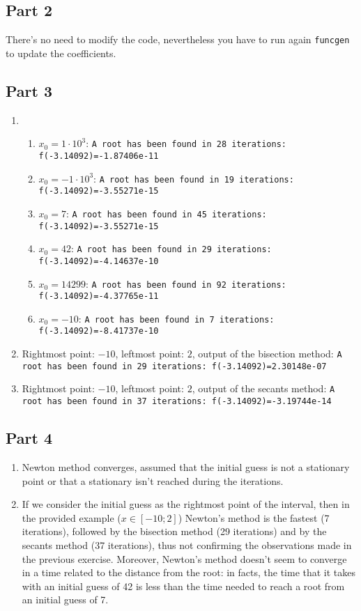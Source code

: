 \documentclass[a4paper,12pt]{article}
\begin{document}
     \subsection{Part 2}
          \par There's no need to modify the code, nevertheless you have to run again \verb|funcgen| to update the coefficients.
     \subsection{Part 3}
          \begin{enumerate}
               \item \begin{enumerate}
                    \item $x_0=1\cdot 10^3$: \verb|A root has been found in 28 iterations: f(-3.14092)=-1.87406e-11|
                    \item $x_0= - 1\cdot 10^3$: \verb|A root has been found in 19 iterations: f(-3.14092)=-3.55271e-15|
                    \item $x_0=7$: \verb|A root has been found in 45 iterations: f(-3.14092)=-3.55271e-15|
                    \item $x_0=42$: \verb|A root has been found in 29 iterations: f(-3.14092)=-4.14637e-10|
                    \item $x_0=14299$: \verb|A root has been found in 92 iterations: f(-3.14092)=-4.37765e-11|
                    \item $x_0=-10$: \verb|A root has been found in 7 iterations: f(-3.14092)=-8.41737e-10|
               \end{enumerate}
               \item Rightmost point: $-10$, leftmost point: $2$, output of the bisection method: \texttt{A root has been found in 29 iterations: f(-3.14092)=2.30148e-07}
               \item Rightmost point: $-10$, leftmost point: $2$, output of the secants method: \texttt{A root has been found in 37 iterations: f(-3.14092)=-3.19744e-14}
          \end{enumerate}
     \subsection{Part 4}
          \begin{enumerate}
               \item Newton method converges, assumed that the initial guess is not a stationary point or that a stationary isn't reached during the iterations.
               \item If we consider the initial guess as the rightmost point of the interval, then in the provided example ($x \in [-10;2]$) Newton's method is the fastest (7 iterations), followed by the bisection method (29 iterations) and by the secants method (37 iterations), thus not confirming the observations made in the previous exercise. Moreover, Newton's method doesn't seem to converge in a time related to the distance from the root: in facts, the time that it takes with an initial guess of 42 is less than the time needed to reach a root from an initial guess of 7.
          \end{enumerate}
\end{document}
